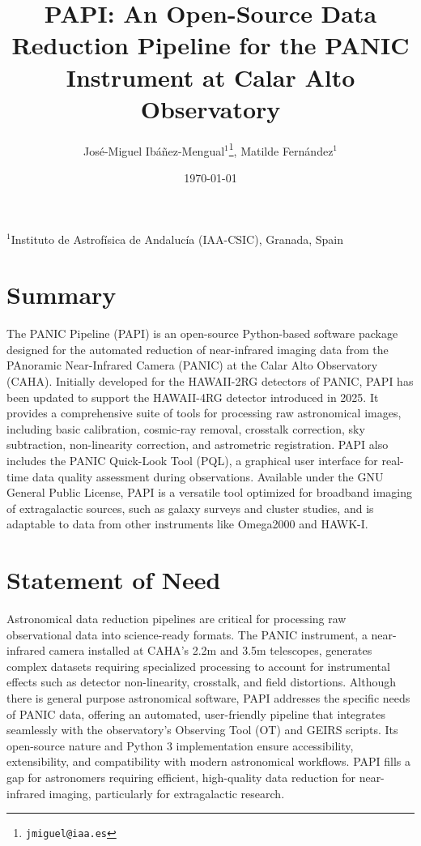 \documentclass[10pt]{article}
\title{PAPI: An Open-Source Data Reduction Pipeline for the PANIC Instrument at Calar Alto Observatory}
\author{
  José-Miguel Ibáñez-Mengual$^{1}$\thanks{\texttt{jmiguel@iaa.es}}, 
  Matilde Fernández$^{1}$
}
\date{\today}
\begin{document}
\maketitle

\begin{center}
  $^1$Instituto de Astrofísica de Andalucía (IAA-CSIC), Granada, Spain
\end{center}

\section*{Summary}

The PANIC Pipeline (PAPI) is an open-source Python-based software package designed for the automated reduction of near-infrared imaging data from the PAnoramic Near-Infrared Camera (PANIC) at the Calar Alto Observatory (CAHA). Initially developed for the HAWAII-2RG detectors of PANIC, PAPI has been updated to support the HAWAII-4RG detector introduced in 2025. It provides a comprehensive suite of tools for processing raw astronomical images, including basic calibration, cosmic-ray removal, crosstalk correction, sky subtraction, non-linearity correction, and astrometric registration. PAPI also includes the PANIC Quick-Look Tool (PQL), a graphical user interface for real-time data quality assessment during observations. Available under the GNU General Public License, PAPI is a versatile tool optimized for broadband imaging of extragalactic sources, such as galaxy surveys and cluster studies, and is adaptable to data from other instruments like Omega2000 and HAWK-I. \cite{ibanez2010panic}

\section*{Statement of Need}

Astronomical data reduction pipelines are critical for processing raw observational data into science-ready formats. The PANIC instrument, a near-infrared camera installed at CAHA’s 2.2m and 3.5m telescopes, generates complex datasets requiring specialized processing to account for instrumental effects such as detector non-linearity, crosstalk, and field distortions. Although there is general purpose astronomical software, PAPI addresses the specific needs of PANIC data, offering an automated, user-friendly pipeline that integrates seamlessly with the observatory’s Observing Tool (OT) and GEIRS scripts. Its open-source nature and Python 3 implementation ensure accessibility, extensibility, and compatibility with modern astronomical workflows. PAPI fills a gap for astronomers requiring efficient, high-quality data reduction for near-infrared imaging, particularly for extragalactic research.
\end{document}
